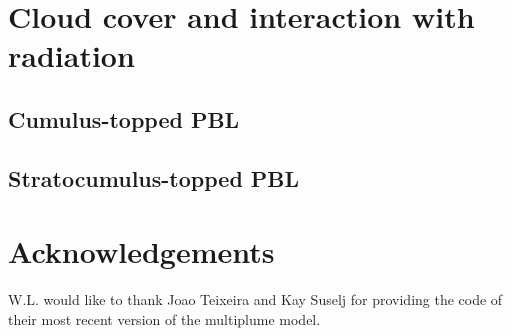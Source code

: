\documentclass[dvipdfmx,a4paper,10pt]{article}
\begin{document}
\section{Cloud cover and interaction with radiation}\label{sec:clouds}

\subsection{Cumulus-topped PBL}

\subsection{Stratocumulus-topped PBL}



\section{Acknowledgements}
W.L. would like to thank Joao Teixeira and Kay Suselj for providing the code of their most recent version of the multiplume model. 




%

 
\end{document}
